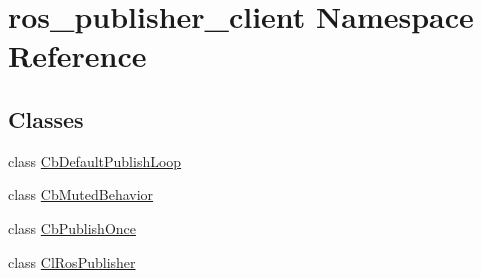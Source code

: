 \hypertarget{namespaceros__publisher__client}{}\section{ros\+\_\+publisher\+\_\+client Namespace Reference}
\label{namespaceros__publisher__client}
\subsection*{Classes}
\begin{DoxyCompactItemize}
\item 
class \hyperlink{classros__publisher__client_1_1CbDefaultPublishLoop}{Cb\+Default\+Publish\+Loop}
\item 
class \hyperlink{classros__publisher__client_1_1CbMutedBehavior}{Cb\+Muted\+Behavior}
\item 
class \hyperlink{classros__publisher__client_1_1CbPublishOnce}{Cb\+Publish\+Once}
\item 
class \hyperlink{classros__publisher__client_1_1ClRosPublisher}{Cl\+Ros\+Publisher}
\end{DoxyCompactItemize}
